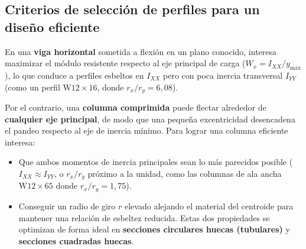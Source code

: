 
\subsection{Criterios de selección de perfiles para un diseño eficiente}
En una \textbf{viga horizontal} sometida a flexión en un plano conocido, interesa maximizar el módulo resistente respecto al eje principal de carga ($W_x = I_{XX}/y_{\text{máx}}$), lo que conduce a perfiles esbeltos en $I_{XX}$ pero con poca inercia transversal $I_{YY}$ (como un perfil $\text{W}12\times 16$, donde $r_x/r_y = 6{,}08$).

Por el contrario, una \textbf{columna comprimida} puede flectar alrededor de \textbf{cualquier eje principal}, de modo que una pequeña excentricidad desencadena el pandeo respecto al eje de inercia mínimo. Para lograr una columna eficiente interesa:
\begin{itemize}
    \item Que ambos momentos de inercia principales sean lo más parecidos posible ($I_{XX} \approx I_{YY}$, o $r_x/r_y$ próximo a la unidad, como las columnas de ala ancha $\text{W}12\times 65$ donde $r_x/r_y = 1{,}75$).
    \item Conseguir un radio de giro $r$ elevado alejando el material del centroide para mantener una relación de esbeltez reducida. Estas dos propiedades se optimizan de forma ideal en \textbf{secciones circulares huecas (tubulares)} y \textbf{secciones cuadradas huecas}.
\end{itemize}

